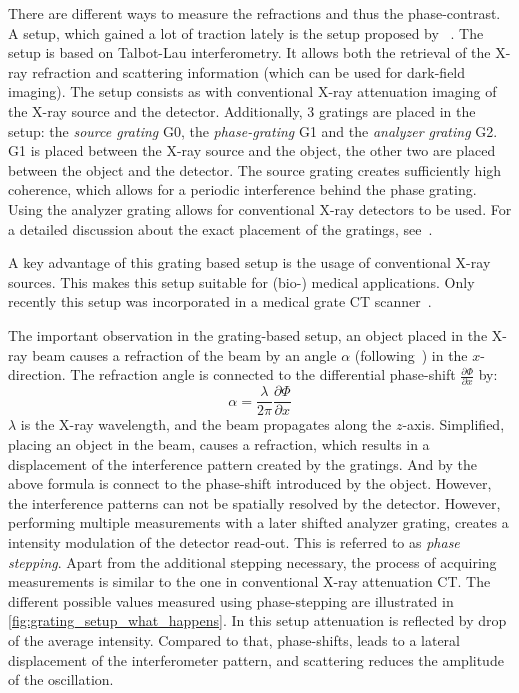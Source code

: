 There are different ways to measure the refractions and thus the phase-contrast. A setup, which
gained a lot of traction lately is the setup proposed by
~\cite{pfeiffer_phase_2006,pfeiffer_hard-x-ray_2008}. The setup is based on Talbot-Lau
interferometry. It allows both the retrieval of the X-ray refraction and scattering information
(which can be used for dark-field imaging). The setup consists as with conventional X-ray
attenuation imaging of the X-ray source and the detector. Additionally, 3 gratings are placed in the
setup: the \textit{source grating} G0, the \textit{phase-grating} G1 and the \textit{analyzer
	grating} G2. G1 is placed between the X-ray source and the object, the other two are placed
between the object and the detector. The source grating creates sufficiently high coherence, which
allows for a periodic interference behind the phase grating. Using the analyzer grating allows for
conventional X-ray detectors to be used. For a detailed discussion about the exact placement of the
gratings, see~\cite{donath_inverse_2009}.

A key advantage of this grating based setup is the usage of conventional X-ray sources. This makes
this setup suitable for (bio-) medical applications. Only recently this setup was incorporated in a
medical grate CT scanner~\cite{viermetz_dark-field_2022}.

The important observation in the grating-based setup, an object placed in the X-ray beam causes a
refraction of the beam by an angle \(\alpha\) (following~\cite{donath_inverse_2009}) in the
\(x\)-direction. The refraction angle is connected to the differential phase-shift \(\frac{\partial
	\Phi}{\partial x}\) by:
\[ \alpha = \frac{\lambda}{2 \pi} \frac{\partial \Phi}{\partial x} \]
\(\lambda\) is the X-ray wavelength, and the beam propagates along the \(z\)-axis.
Simplified, placing an object in the beam, causes a refraction, which results in a displacement of
the interference pattern created by the gratings. And by the above formula is connect to the
phase-shift introduced by the object. However, the interference patterns can not be spatially
resolved by the detector. However, performing multiple measurements with a later shifted analyzer
grating, creates a intensity modulation of the detector read-out. This is referred to as
\textit{phase stepping}. Apart from the additional stepping necessary, the process of acquiring
measurements is similar to the one in conventional X-ray attenuation CT\@. The different possible
values measured using phase-stepping are illustrated in \autoref{fig:grating_setup_what_happens}.
In this setup attenuation is reflected by drop of the average intensity. Compared to that,
phase-shifts, leads to a lateral displacement of the interferometer pattern, and scattering reduces
the amplitude of the oscillation.

